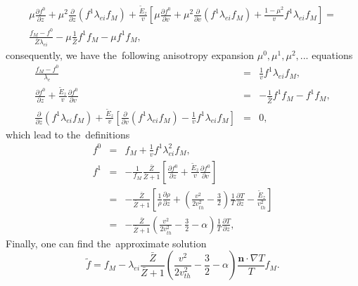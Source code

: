 \documentclass[review]{elsarticle}
\newcommand{\pdv}[2]{\frac{\partial{#1}}{\partial{#2}}}
\newcommand{\vect}[1]{\boldsymbol{#1}}
\newcommand{\mfpe}{\lambda_e}
\newcommand{\mfpei}{\lambda_{ei}}
\newcommand{\Zbar}{\bar{Z}}
\newcommand{\vmag}{v}
\newcommand{\vth}{v_{th}}
\newcommand{\vn}{\vect{n}}
\newcommand{\fM}{f_M}
\begin{document}
\begin{multline}
  \mu\pdv{f^0}{z} + \mu^2 \pdv{}{z}\left(f^1 \mfpei\fM \right)
  + \frac{\tilde{E}_z}{\vmag} \left[ \mu \pdv{f^0}{\vmag} 
  + \mu^2 \pdv{}{\vmag} \left( f^1 \mfpei\fM \right) 
  + \frac{1 - \mu^2}{\vmag}f^1 \mfpei\fM
  \right] 
  =\\
  \frac{\fM - f^0}{\Zbar\mfpei} - \mu \frac{1}{\Zbar}f^1 \fM
  - \mu
  f^1 \fM ,
  \label{eq:BGK_spherical}
\end{multline}
consequently, we have the~following anisotropy expansion 
$\mu^0, \mu^1, \mu^2, ...$ equations
\begin{eqnarray}
  \frac{\fM - f^0}{\mfpe} &=& \frac{1}{\vmag}f^1 \mfpei\fM , 
  \nonumber \\
  \pdv{f^0}{z} + \frac{\tilde{E}_z}{\vmag}\pdv{f^0}{\vmag} &=& 
  - \frac{1}{\Zbar}f^1 \fM - f^1 \fM , 
  \nonumber \\ 
  \pdv{}{z}\left(f^1 \mfpei\fM \right) 
  + \frac{\tilde{E}_z}{\vmag} \left[\pdv{}{\vmag} \left( f^1 \mfpei\fM \right)
  - \frac{1}{\vmag}f^1 \mfpei\fM \right] &=& 0 , \nonumber
\end{eqnarray}
which lead to the~definitions
\begin{eqnarray}
  f^0 &=& \fM + \frac{1}{\vmag}f^1 \mfpei^2\fM ,
  \label{eq:BGK_f0} \\
  f^1 &=& - \frac{1}{\fM}\frac{\Zbar}{\Zbar+1}
  \left[ \pdv{f^0}{z} + \frac{\tilde{E}_z}{\vmag}\pdv{f^0}{\vmag} \right] 
  \nonumber \\
  &=& - \frac{\Zbar}{\Zbar+1}
  \left[\frac{1}{\rho}\pdv{\rho}{z} + 
  \left( \frac{\vmag^2}{2 \vth^2} - \frac{3}{2}\right)
  \frac{1}{T}\pdv{T}{z} - \frac{\tilde{E}_z}{\vth^2} \right] 
  \nonumber \\
  &=& - \frac{\Zbar}{\Zbar+1}
  \left( \frac{\vmag^2}{2 \vth^2} - \frac{3}{2} - \alpha\right)
  \frac{1}{T}\pdv{T}{z} ,
  \label{eq:BGK_f1}
\end{eqnarray}
Finally, one can find the~approximate solution
\begin{equation}
  \tilde{f} = \fM - \mfpei\frac{\Zbar}{\Zbar+1}
  \left( \frac{\vmag^2}{2 \vth^2} - \frac{3}{2} - \alpha\right)
  \frac{\vn\cdot\nabla T}{T}\fM .
  \label{eq:BGK_approximate_solution}
\end{equation}
\end{document}

